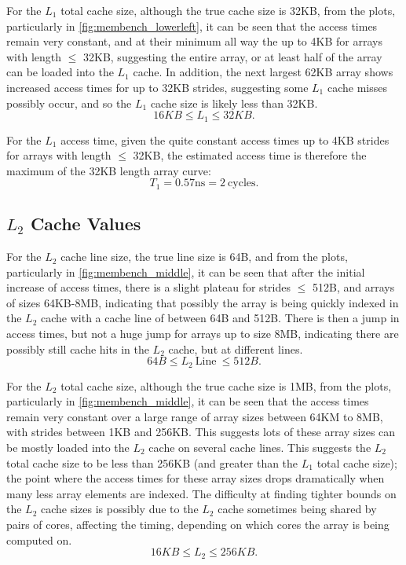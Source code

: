 \documentclass[letterpaper]{article}
\begin{document}
For the $L_1$ total cache size, although the true cache size is 32KB, from the plots, particularly in \cref{fig:membench_lowerleft}, it can be seen that the access times remain very constant, and at their minimum all way the up to 4KB for arrays with length $\leq$ 32KB, suggesting the entire array, or at least half of the array can be loaded into the $L_1$ cache. In addition, the next largest 62KB array shows increased access times for up to 32KB strides, suggesting some $L_1$ cache misses possibly occur, and so the $L_1$ cache size is likely less than 32KB.
$$ 16KB \leq L_1 \leq 32KB. $$

For the $L_1$ access time, given the quite constant access times up to 4KB strides for arrays with length $\leq$ 32KB, the estimated access time is therefore the maximum of the 32KB length array curve:
$$ T_1 = 0.57 \textrm{ns} = 2~\textrm{cycles}.$$





\subsection{$L_2$ Cache Values}
For the $L_2$ cache line size, the true line size is 64B, and from the plots, particularly in \cref{fig:membench_middle}, it can be seen that after the initial increase of access times, there is a slight plateau for strides $\leq$ 512B, and arrays of sizes 64KB-8MB, indicating that possibly the array is being quickly indexed in the $L_2$ cache with a cache line of between 64B and 512B. There is then a jump in access times, but not a huge jump for arrays up to size 8MB, indicating there are possibly still cache hits in the $L_2$ cache, but at different lines.
$$ 64B \leq L_2 ~\textrm{Line}~ \leq 512B. $$


For the $L_2$ total cache size, although the true cache size is 1MB, from the plots, particularly in \cref{fig:membench_middle}, it can be seen that the access times remain very constant over a large range of array sizes between 64KM to 8MB, with strides between 1KB and 256KB. This suggests lots of these array sizes can be mostly loaded into the $L_2$ cache on several cache lines. This suggests the $L_2$ total cache size to be less than 256KB (and greater than the $L_1$ total cache size); the point where the access times for these array sizes drops dramatically when many less array elements are indexed. The difficulty at finding tighter bounds on the $L_2$ cache sizes is possibly due to the $L_2$ cache sometimes being shared by pairs of cores, affecting the timing, depending on which cores the array is being computed on.
$$ 16KB \leq L_2 \leq 256KB. $$
\end{document}
